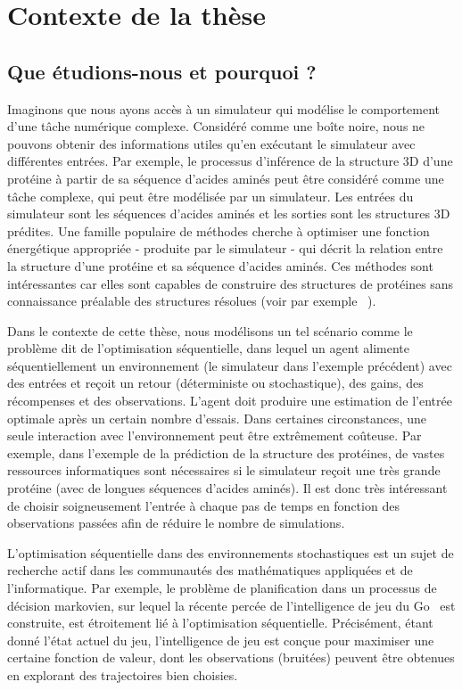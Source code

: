 \section{Contexte de la th\`ese}\label{sec:abs.context}
	
\subsection{Que \'etudions-nous et pourquoi ?}\label{sec:abs.context.what}

Imaginons que nous ayons accès à un simulateur qui modélise le comportement d'une tâche numérique complexe. Considéré comme une boîte noire, nous ne pouvons obtenir des informations utiles qu'en exécutant le simulateur avec différentes entrées. Par exemple, le processus d'inférence de la structure 3D d'une protéine à partir de sa séquence d'acides aminés peut être considéré comme une tâche complexe, qui peut être modélisée par un simulateur. Les entrées du simulateur sont les séquences d'acides aminés et les sorties sont les structures 3D prédites. Une famille populaire de méthodes cherche à optimiser une fonction énergétique appropriée - produite par le simulateur - qui décrit la relation entre la structure d'une protéine et sa séquence d'acides aminés. Ces méthodes sont intéressantes car elles sont capables de construire des structures de protéines sans connaissance préalable des structures résolues (voir par exemple ~\citealt{zhang2008}).

Dans le contexte de cette thèse, nous modélisons un tel scénario comme le problème dit de l'optimisation séquentielle, dans lequel un agent alimente séquentiellement un environnement (le simulateur dans l'exemple précédent) avec des entrées et reçoit un retour (déterministe ou stochastique), des gains, des récompenses et des observations. L'agent doit produire une estimation de l'entrée optimale après un certain nombre d'essais. Dans certaines circonstances, une seule interaction avec l'environnement peut être extrêmement coûteuse. Par exemple, dans l'exemple de la prédiction de la structure des protéines, de vastes ressources informatiques sont nécessaires si le simulateur reçoit une très grande protéine (avec de longues séquences d'acides aminés). Il est donc très intéressant de choisir soigneusement l'entrée à chaque pas de temps en fonction des observations passées afin de réduire le nombre de simulations.

L'optimisation séquentielle dans des environnements stochastiques est un sujet de recherche actif dans les communautés des mathématiques appliquées et de l'informatique. Par exemple, le problème de planification dans un processus de d\'ecision markovien, sur lequel la récente percée de l'intelligence de jeu du Go~\citep{silver2016alphago} est construite, est étroitement lié à l'optimisation séquentielle. Précisément, étant donné l'état actuel du jeu, l'intelligence de jeu est conçue pour maximiser une certaine fonction de valeur, dont les observations (bruitées) peuvent être obtenues en explorant des trajectoires bien choisies.

